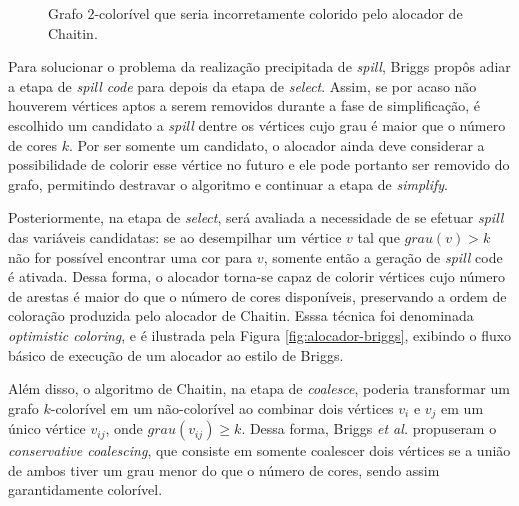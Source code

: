 \documentclass[
	12pt,				%
	openright,			%
	oneside,			%
	a4paper,			%
	tccpreliminar,			%
	]{ABNT-DC-UEL}
\begin{document}
\begin{figure}[ht]
    \centering
    \caption{Grafo $2$-colorível que seria incorretamente colorido pelo alocador de Chaitin.}
    \label{fig:grafo-diamante}
\end{figure}

Para solucionar o problema da realização precipitada de \textit{spill}, Briggs propôs adiar a etapa de \textit{spill code} para depois da etapa de \textit{select}. Assim, se por acaso não houverem vértices aptos a serem removidos durante a fase de simplificação, é escolhido um candidato a \textit{spill} dentre os vértices cujo grau é maior que o número de cores $k$. Por ser somente um candidato, o alocador ainda deve considerar a possibilidade de colorir esse vértice no futuro e ele pode portanto ser removido do grafo, permitindo destravar o algoritmo e continuar a etapa de \textit{simplify}. 

Posteriormente, na etapa de \textit{select}, será avaliada a necessidade de se efetuar \textit{spill} das variáveis candidatas: se ao desempilhar um vértice $v$ tal que $\mathit{grau}(v)>k$ não for possível encontrar uma cor para $v$, somente então a geração de \textit{spill} code é ativada. Dessa forma, o alocador torna-se capaz de colorir vértices cujo número de arestas é maior do que o número de cores disponíveis, preservando a ordem de coloração produzida pelo alocador de Chaitin. Esssa técnica foi denominada \textit{optimistic coloring}, e é ilustrada pela Figura \ref{fig:alocador-briggs}, exibindo o fluxo básico de execução de um alocador ao estilo de Briggs.

Além disso, o algoritmo de Chaitin, na etapa de \textit{coalesce}, poderia transformar um grafo $k$-colorível em um não-colorível ao combinar dois vértices $v_i$ e $v_j$ em um único vértice $v_{ij}$, onde $grau(v_{ij})\geq k$. Dessa forma, Briggs \textit{et al.} \cite{briggs2:92} propuseram o \textit{conservative coalescing}, que consiste em somente coalescer dois vértices se a união de ambos tiver um grau menor do que o número de cores, sendo assim garantidamente colorível.
\end{document}
